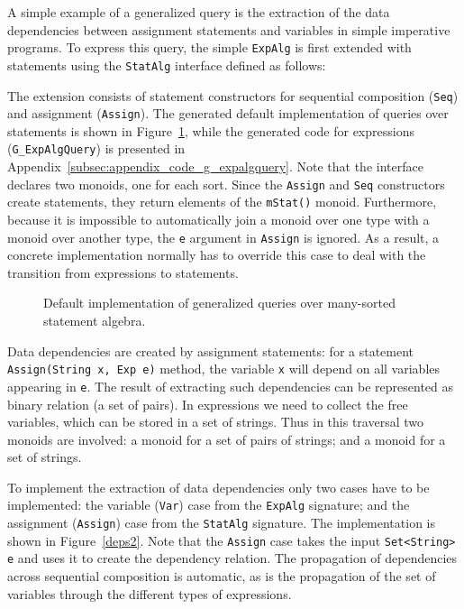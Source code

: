 A simple example of a generalized query is the extraction of the data
dependencies between assignment statements and variables in simple
imperative programs.  To express this query, the simple
\lstinline{ExpAlg} is first extended with statements using the
\lstinline{StatAlg} interface defined as follows:


The extension consists of statement constructors for sequential composition
(\lstinline{Seq}) and assignment (\lstinline{Assign}).  The generated
default implementation of queries over statements is shown in
Figure~\ref{LST:gstatquery}, while the generated code for expressions (\lstinline{G_ExpAlgQuery}) is
presented in Appendix~\ref{subsec:appendix_code_g_expalgquery}.  Note that the interface declares two
monoids, one for each sort.  Since the \lstinline{Assign} and
\lstinline{Seq} constructors create statements, they return elements
of the \lstinline{mStat()} monoid.  Furthermore, because it is
impossible to automatically join a monoid over one type with a monoid
over another type, the \lstinline{e} argument in \lstinline{Assign}
is ignored.  As a result, a
concrete implementation normally has to override this case to deal with the
transition from expressions to statements.

\begin{figure}[t]
\nocaptionrule
\caption{Default implementation of generalized queries over many-sorted statement algebra.}
\label{LST:gstatquery}
\end{figure}



Data dependencies are created by assignment statements: for a
statement \lstinline{Assign(String x, Exp e)} method, the variable
\lstinline{x} will depend on all variables appearing in \lstinline{e}.
The result of extracting such dependencies can be represented as
binary relation (a set of pairs). In expressions we need to collect
the free variables, which can be stored in a set of strings.  Thus in
this traversal two monoids are involved: a monoid for a set of pairs
of strings; and a monoid for a set of strings.

To implement the extraction of data dependencies only two cases have to
be implemented: the variable (\lstinline{Var}) case from the
\lstinline{ExpAlg} signature; and the assignment (\lstinline{Assign})
case from the \lstinline{StatAlg} signature.  The implementation is
shown in Figure~\ref{deps2}.  Note that the \lstinline{Assign} case takes
the input \lstinline{Set<String> e} and uses it to create the
dependency relation.  The propagation of dependencies across
sequential composition is automatic, as is the propagation of the set
of variables through the different types of expressions.


